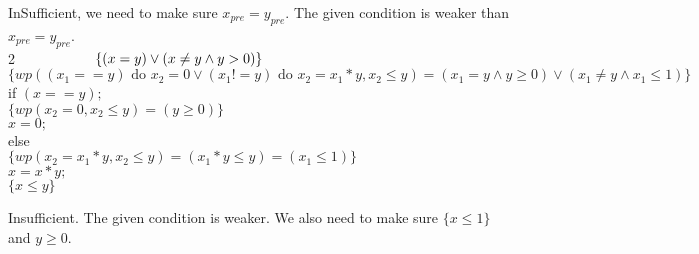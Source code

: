 \documentclass[12pt]{article}
\begin{document}
	InSufficient, we need to make sure $x_{pre} = y_{pre}$. The given condition is weaker than $x_{pre} = y_{pre}$.\\
	
	2$\hspace*{1.65cm}\quad\{(x=y)\vee(x\neq y\wedge y>0)\}$\\
	\hspace*{2.5cm}\quad$\{wp((x_1==y) \text{ do }x_2=0 \lor (x_1 != y) \text{ do }x_2=x_1*y,x_2\le y)=(x_1=y\land y \ge 0)\lor(x_1\neq y\land x_1 \le 1)\}$\\
	\hspace*{1cm}\quad if $(x==y);$\\
	\hspace*{2.5cm}\quad$\{wp(x_2=0,x_2\le y)=(y \ge 0)\}$\\
	\hspace*{2.5cm} $x=0;$\\
	\hspace*{1cm}\quad else\\
	\hspace*{2.5cm}\quad$\{wp(x_2=x_1*y,x_2\le y)=(x_1*y\le y)=(x_1\le 1)\}$\\
	\hspace*{2.5cm} $x=x*y;$\\
	\hspace*{2.5cm}\quad$\{x\le y\}$
	
	Insufficient. The given condition is weaker. We also need to make sure $\{x \leq 1\}$ and $y \geq 0$.
	\bigskip
	
\end{document}

